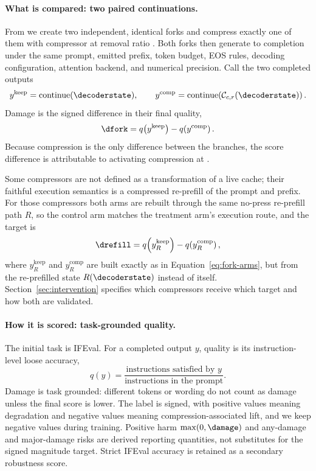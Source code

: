 \paragraph{What is compared: two paired continuations.}
From \decoderstate{} we create two independent, identical forks and compress
exactly one of them with compressor \compressor{} at removal ratio \ratio{}.
Both forks then generate to completion under the same prompt, emitted prefix,
token budget, EOS rules, decoding configuration, attention backend, and
numerical precision. Call the two completed outputs
\begin{equation}
y^{\mathrm{keep}} = \operatorname{continue}(\decoderstate),
\qquad
y^{\mathrm{comp}} = \operatorname{continue}\!\left(\mathcal{C}_{c,r}(\decoderstate)\right).
\label{eq:fork-arms}
\end{equation}
Damage is the signed difference in their final quality,
\begin{equation}
\dfork = q\!\left(y^{\mathrm{keep}}\right) - q\!\left(y^{\mathrm{comp}}\right).
\label{eq:fork-damage}
\end{equation}
Because compression is the only difference between the branches, the score
difference is attributable to activating compression at \switchpos.

Some compressors are not defined as a transformation of a live cache; their
faithful execution semantics is a compressed re-prefill of the prompt and
prefix. For those compressors both arms are rebuilt through the same no-press
re-prefill path $R$, so the control arm matches the treatment arm's execution
route, and the target is
\begin{equation}
\drefill = q\!\left(y_R^{\mathrm{keep}}\right) - q\!\left(y_R^{\mathrm{comp}}\right),
\label{eq:refill-damage}
\end{equation}
where $y_R^{\mathrm{keep}}$ and $y_R^{\mathrm{comp}}$ are built exactly as in
Equation~\ref{eq:fork-arms}, but from the re-prefilled state
$R(\decoderstate)$ instead of \decoderstate{} itself.
Section~\ref{sec:intervention} specifies which compressors receive which
target and how both are validated.

\paragraph{How it is scored: task-grounded quality.}
The initial task is IFEval. For a completed output $y$, quality is its
instruction-level loose accuracy,
\begin{equation}
q(y) = \frac{\text{instructions satisfied by } y}
{\text{instructions in the prompt}}.
\label{eq:quality}
\end{equation}
Damage is task grounded: different tokens or wording do not count as damage
unless the final score is lower. The label \damage{} is signed, with positive
values meaning degradation and negative values meaning compression-associated
lift, and we keep negative values during training. Positive harm
$\max(0,\damage)$ and any-damage and major-damage risks are derived reporting
quantities, not substitutes for the signed magnitude target. Strict IFEval
accuracy is retained as a secondary robustness score.
